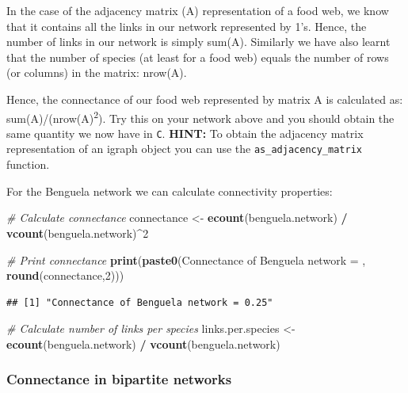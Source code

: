 \documentclass[
]{article}
\newenvironment{Shaded}{\begin{snugshade}}{\end{snugshade}}
\newcommand{\CommentTok}[1]{\textcolor[rgb]{0.56,0.35,0.01}{\textit{#1}}}
\newcommand{\DecValTok}[1]{\textcolor[rgb]{0.00,0.00,0.81}{#1}}
\newcommand{\FunctionTok}[1]{\textcolor[rgb]{0.13,0.29,0.53}{\textbf{#1}}}
\newcommand{\NormalTok}[1]{#1}
\newcommand{\OtherTok}[1]{\textcolor[rgb]{0.56,0.35,0.01}{#1}}
\newcommand{\SpecialCharTok}[1]{\textcolor[rgb]{0.81,0.36,0.00}{\textbf{#1}}}
\newcommand{\StringTok}[1]{\textcolor[rgb]{0.31,0.60,0.02}{#1}}
\begin{document}
In the case of the adjacency matrix (A) representation of a food web, we
know that it contains all the links in our network represented by 1's.
Hence, the number of links in our network is simply sum(A). Similarly we
have also learnt that the number of species (at least for a food web)
equals the number of rows (or columns) in the matrix: nrow(A).

Hence, the connectance of our food web represented by matrix A is
calculated as: sum(A)/(nrow(A)\textsuperscript{2}). Try this on your
network above and you should obtain the same quantity we now have in
\texttt{C}. \textbf{HINT:} To obtain the adjacency matrix representation
of an igraph object you can use the \texttt{as\_adjacency\_matrix}
function.

For the Benguela network we can calculate connectivity properties:

\begin{Shaded}
\begin{Highlighting}[]
\CommentTok{\# Calculate connectance}
\NormalTok{connectance }\OtherTok{\textless{}{-}} \FunctionTok{ecount}\NormalTok{(benguela.network) }\SpecialCharTok{/} \FunctionTok{vcount}\NormalTok{(benguela.network)}\SpecialCharTok{\^{}}\DecValTok{2} 

\CommentTok{\# Print connectance}
\FunctionTok{print}\NormalTok{(}\FunctionTok{paste0}\NormalTok{(}\StringTok{\textquotesingle{}Connectance of Benguela network = \textquotesingle{}}\NormalTok{, }\FunctionTok{round}\NormalTok{(connectance,}\DecValTok{2}\NormalTok{)))}
\end{Highlighting}
\end{Shaded}

\begin{verbatim}
## [1] "Connectance of Benguela network = 0.25"
\end{verbatim}

\begin{Shaded}
\begin{Highlighting}[]
\CommentTok{\# Calculate number of links per species}
\NormalTok{links.per.species }\OtherTok{\textless{}{-}} \FunctionTok{ecount}\NormalTok{(benguela.network) }\SpecialCharTok{/} \FunctionTok{vcount}\NormalTok{(benguela.network)}
\end{Highlighting}
\end{Shaded}

\subsubsection{Connectance in bipartite
networks}\label{connectance-in-bipartite-networks}
\end{document}
